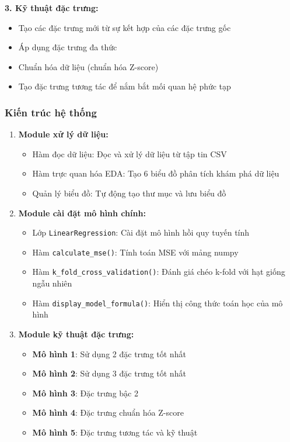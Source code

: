 \textbf{3. Kỹ thuật đặc trưng:}
\begin{itemize}
	\item Tạo các đặc trưng mới từ sự kết hợp của các đặc trưng gốc
	\item Áp dụng đặc trưng đa thức
	\item Chuẩn hóa dữ liệu (chuẩn hóa Z-score)
	\item Tạo đặc trưng tương tác để nắm bắt mối quan hệ phức tạp
\end{itemize}

\subsubsection{Kiến trúc hệ thống}
\begin{enumerate}
	\item \textbf{Module xử lý dữ liệu:}
	      \begin{itemize}
		      \item Hàm đọc dữ liệu: Đọc và xử lý dữ liệu từ tập tin CSV
		      \item Hàm trực quan hóa EDA: Tạo 6 biểu đồ phân tích khám phá dữ liệu
		      \item Quản lý biểu đồ: Tự động tạo thư mục và lưu biểu đồ
	      \end{itemize}

	\item \textbf{Module cài đặt mô hình chính:}
	      \begin{itemize}
		      \item Lớp \texttt{LinearRegression}: Cài đặt mô hình hồi quy tuyến tính
		      \item Hàm \texttt{calculate\_mse()}: Tính toán MSE với mảng numpy
		      \item Hàm \texttt{k\_fold\_cross\_validation()}: Đánh giá chéo k-fold với hạt giống ngẫu nhiên
		      \item Hàm \texttt{display\_model\_formula()}: Hiển thị công thức toán học của mô hình
	      \end{itemize}

	\item \textbf{Module kỹ thuật đặc trưng:}
	      \begin{itemize}
		      \item \textbf{Mô hình 1}: Sử dụng 2 đặc trưng tốt nhất
		      \item \textbf{Mô hình 2}: Sử dụng 3 đặc trưng tốt nhất
		      \item \textbf{Mô hình 3}: Đặc trưng bậc 2
		      \item \textbf{Mô hình 4}: Đặc trưng chuẩn hóa Z-score
		      \item \textbf{Mô hình 5}: Đặc trưng tương tác và kỹ thuật
	      \end{itemize}


\end{enumerate}
